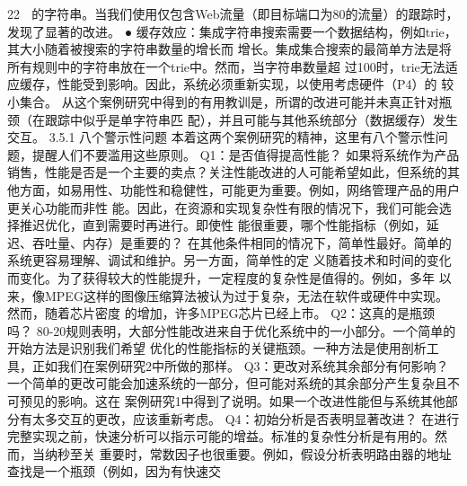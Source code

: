                                                       22
   的字符串。当我们使用仅包含Web流量（即目标端口为80的流量）的跟踪时，发现了显著的改进。
 ● 缓存效应：集成字符串搜索需要一个数据结构，例如trie，其大小随着被搜索的字符串数量的增长而
   增长。集成集合搜索的最简单方法是将所有规则中的字符串放在一个trie中。然而，当字符串数量超
   过100时，trie无法适应缓存，性能受到影响。因此，系统必须重新实现，以使用考虑硬件（P4）的
   较小集合。
从这个案例研究中得到的有用教训是，所谓的改进可能并未真正针对瓶颈（在跟踪中似乎是单字符串匹
配），并且可能与其他系统部分（数据缓存）发生交互。
3.5.1 八个警示性问题
本着这两个案例研究的精神，这里有八个警示性问题，提醒人们不要滥用这些原则。
Q1：是否值得提高性能？
如果将系统作为产品销售，性能是否是一个主要的卖点？关注性能改进的人可能希望如此，但系统的其
他方面，如易用性、功能性和稳健性，可能更为重要。例如，网络管理产品的用户更关心功能而非性
能。因此，在资源和实现复杂性有限的情况下，我们可能会选择推迟优化，直到需要时再进行。即使性
能很重要，哪个性能指标（例如，延迟、吞吐量、内存）是重要的？
在其他条件相同的情况下，简单性最好。简单的系统更容易理解、调试和维护。另一方面，简单性的定
义随着技术和时间的变化而变化。为了获得较大的性能提升，一定程度的复杂性是值得的。例如，多年
以来，像MPEG这样的图像压缩算法被认为过于复杂，无法在软件或硬件中实现。然而，随着芯片密度
的增加，许多MPEG芯片已经上市。
Q2：这真的是瓶颈吗？
80-20规则表明，大部分性能改进来自于优化系统中的一小部分。一个简单的开始方法是识别我们希望
优化的性能指标的关键瓶颈。一种方法是使用剖析工具，正如我们在案例研究2中所做的那样。
Q3：更改对系统其余部分有何影响？
一个简单的更改可能会加速系统的一部分，但可能对系统的其余部分产生复杂且不可预见的影响。这在
案例研究1中得到了说明。如果一个改进性能但与系统其他部分有太多交互的更改，应该重新考虑。
Q4：初始分析是否表明显著改进？
在进行完整实现之前，快速分析可以指示可能的增益。标准的复杂性分析是有用的。然而，当纳秒至关
重要时，常数因子也很重要。例如，假设分析表明路由器的地址查找是一个瓶颈（例如，因为有快速交

